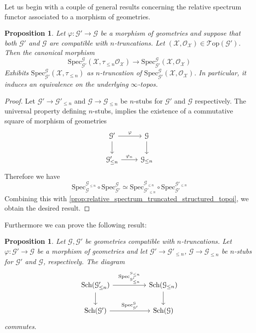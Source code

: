 \documentclass[12pt,a4paper,reqno]{amsart}
\theoremstyle{plain}
\newtheorem{prop}[thm]{Proposition}
\theoremstyle{definition}
\theoremstyle{remark}
\numberwithin{equation}{section}
\begin{document}
Let us begin with a couple of general results concerning the relative spectrum functor associated to a morphism of geometries.

\begin{prop} \label{prop:relative_spectrum_and_truncations}
	Let $\varphi \colon {\mathcal G}' \to {\mathcal G}$ be a morphism of geometries and suppose that both ${\mathcal G}'$ and ${\mathcal G}$ are compatible with $n$-truncations.
	Let $({\mathcal X}, {\mathcal O}_{\mathcal X}) \in {\mathcal T\mathrm{op}}({\mathcal G}')$.
	Then the canonical morphism
	\[ \mathrm{Spec}^{\mathcal G}_{{\mathcal G}'}({\mathcal X}, \tau_{\le n} {\mathcal O}_{\mathcal X}) \to \mathrm{Spec}^{\mathcal G}_{{\mathcal G}'}({\mathcal X}, {\mathcal O}_{\mathcal X}) \]
	Exhibits $\mathrm{Spec}^{\mathcal G}_{{\mathcal G}'}({\mathcal X}, \tau_{\le n})$ as $n$-truncation of $\mathrm{Spec}^{\mathcal G}_{{\mathcal G}'}({\mathcal X}, {\mathcal O}_{\mathcal X})$.
	In particular, it induces an equivalence on the underlying $\infty$-topos.
\end{prop}

\begin{proof}
	Let ${\mathcal G}' \to {\mathcal G}'_{\le n}$ and ${\mathcal G} \to {\mathcal G}_{\le n}$ be $n$-stubs for ${\mathcal G}'$ and ${\mathcal G}$ respectively.
	The universal property defining $n$-stubs, implies the existence of a commutative square of morphism of geometries
	\[ \begin{tikzcd}
	{\mathcal G}' \arrow{r}{\varphi} \arrow{d} & {\mathcal G} \arrow{d} \\
	{\mathcal G}'_{\le n} \arrow{r}{\varphi_n} & {\mathcal G}_{\le n}
	\end{tikzcd} \]
	Therefore we have
	\[ \mathrm{Spec}^{{\mathcal G}_{\le n}}_{\mathcal G} \circ \mathrm{Spec}^{\mathcal G}_{{\mathcal G}'} \simeq \mathrm{Spec}^{{\mathcal G}_{\le n}}_{{\mathcal G}'_{\le n}} \circ \mathrm{Spec}^{{\mathcal G}'_{\le n}}_{{\mathcal G}'} \]
	Combining this with \cref{prop:relative_spectrum_truncated_structured_topoi}, we obtain the desired result.
\end{proof}

Furthermore we can prove the following result:

\begin{prop} \label{prop:relative_spectrum_truncated_objects}
	Let ${\mathcal G}, {\mathcal G}'$ be geometries compatible with $n$-truncations.
	Let $\varphi \colon {\mathcal G}' \to {\mathcal G}$ be a morphism of geometries and let ${\mathcal G}' \to {\mathcal G}'_{\le n}$, ${\mathcal G} \to {\mathcal G}_{\le n}$ be $n$-stubs for ${\mathcal G}'$ and ${\mathcal G}$, respectively.
	The diagram
	\[ \begin{tikzcd}
	{\mathrm{Sch}}({\mathcal G}'_{\le n}) \arrow{rr}{\mathrm{Spec}^{{\mathcal G}_{\le n}}_{{\mathcal G}'_{\le n}}} \arrow{d} & & {\mathrm{Sch}}({\mathcal G}_{\le n}) \arrow{d} \\
	{\mathrm{Sch}}({\mathcal G}') \arrow{rr}{\mathrm{Spec}^{\mathcal G}_{{\mathcal G}'}} & & {\mathrm{Sch}}({\mathcal G})
	\end{tikzcd} \]
	commutes.
\end{prop}
\end{document}
